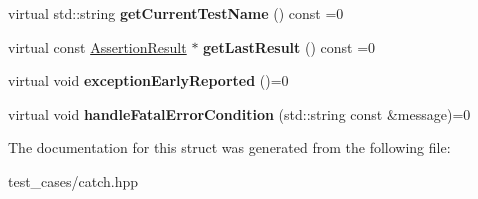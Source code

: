 \begin{DoxyCompactItemize}
\item 
\mbox{\label{structCatch_1_1IResultCapture_aea1617f4a84cc648246aa3ed6918b5bf}} 
virtual std\+::string {\bfseries get\+Current\+Test\+Name} () const =0
\item 
\mbox{\label{structCatch_1_1IResultCapture_ab18872c89fab97405a56e9c6a4919736}} 
virtual const \hyperlink{classCatch_1_1AssertionResult}{Assertion\+Result} $\ast$ {\bfseries get\+Last\+Result} () const =0
\item 
\mbox{\label{structCatch_1_1IResultCapture_ae63ecec95db4c236c63ecf616f483810}} 
virtual void {\bfseries exception\+Early\+Reported} ()=0
\item 
\mbox{\label{structCatch_1_1IResultCapture_a7d995222301e6605f26549726b30c3ee}} 
virtual void {\bfseries handle\+Fatal\+Error\+Condition} (std\+::string const \&message)=0
\end{DoxyCompactItemize}


The documentation for this struct was generated from the following file\+:\begin{DoxyCompactItemize}
\item 
test\+\_\+cases/catch.\+hpp\end{DoxyCompactItemize}
